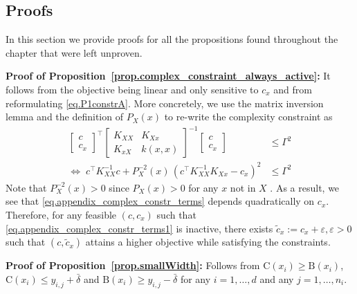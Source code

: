 \subsection{Proofs}
\label{sec.selected_derivations}

In this section we provide proofs for all the propositions found throughout the chapter that were left unproven.

\begin{my_proof}
	\textbf{Proof of Proposition~\ref{prop.complex_constraint_always_active}:}
	It follows from the objective being linear and only sensitive to $c_x$ and from reformulating \eqref{eq.P1constrA}. More concretely, we use the matrix inversion lemma and the definition of $P_X(x)$ to re-write the complexity constraint as
	\begin{subequations}
		\begin{align}
			\begin{bmatrix}
				c \\
				c_x
			\end{bmatrix}^\top 
			\begin{bmatrix}
				K_{XX} & K_{Xx} \\
				K_{xX } & k(x,x)
			\end{bmatrix}^{-1} 
			\begin{bmatrix}
				c \\
				c_x
			\end{bmatrix} & \leq \Gamma^2 
		   \label{eq.appendix_complex_constr_terms1}
		   \\
			\Leftrightarrow \;
			c^\top K^{-1}_{XX} c
			+
			P_{X}^{-2}(x) \, \left( c^\top K_{XX}^{-1} K_{Xx} - c_x \right)^2 
			&\leq \Gamma^2 
			\label{eq.appendix_complex_constr_terms}
		\end{align}
	\end{subequations}
	Note that $P_X^{-2}(x) > 0$ since $P_X(x) > 0$ for any $x$ not in $X$ \citep{karvonen2022error}. As a result, we see that \eqref{eq.appendix_complex_constr_terms} depends quadratically on $c_x$. Therefore, for any feasible $(c, c_x)$ such that \eqref{eq.appendix_complex_constr_terms1} is inactive, there exists $ \tilde c_x := c_x + \varepsilon, \varepsilon > 0$ such that $(c,\tilde c_x)$ attains a higher objective while satisfying the constraints.
\end{my_proof}

\begin{my_proof}
	\textbf{Proof of Proposition~\ref{prop.smallWidth}:}
	Follows from $\text{C}(x_i) \geq \text{B}(x_i)$, $\text{C}(x_i) \leq y_{i,j} + \bar \delta$ and $\text{B}(x_i) \geq y_{i,j} - \bar \delta$ for any $i=1,\dots,d$ and any $j=1,\dots,n_i$. 
\end{my_proof} 

